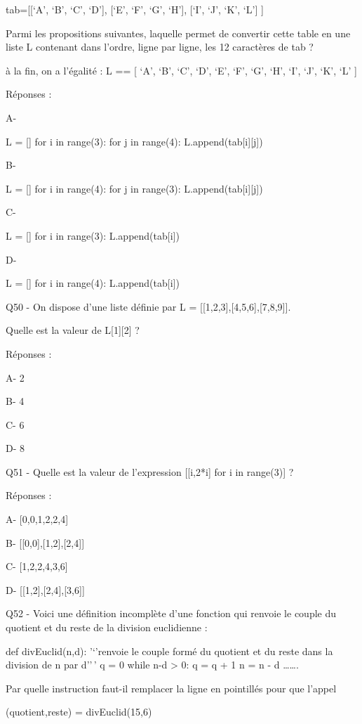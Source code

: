 \documentclass[
]{book}
\begin{document}
tab={[}{[}`A', `B', `C', `D'{]},
{[}`E', `F', `G', `H'{]},
{[}`I', `J', `K', `L'{]} {]}

Parmi les propositions suivantes, laquelle permet de convertir cette table en une liste L contenant dans l'ordre, ligne par ligne, les 12 caractères de tab ?

à la fin, on a l'égalité :
L == {[} `A', `B', `C', `D', `E', `F', `G', `H', `I', `J', `K', `L' {]}

Réponses :

A-

L = {[}{]}
for i in range(3):
for j in range(4):
L.append(tab{[}i{]}{[}j{]})

B-

L = {[}{]}
for i in range(4):
for j in range(3):
L.append(tab{[}i{]}{[}j{]})

C-

L = {[}{]}
for i in range(3):
L.append(tab{[}i{]})

D-

L = {[}{]}
for i in range(4):
L.append(tab{[}i{]})

Q50 - On dispose d'une liste définie par L = {[}{[}1,2,3{]},{[}4,5,6{]},{[}7,8,9{]}{]}.

Quelle est la valeur de L{[}1{]}{[}2{]} ?

Réponses :

A- 2

B- 4

C- 6

D- 8

Q51 - Quelle est la valeur de l'expression {[}{[}i,2*i{]} for i in range(3){]} ?

Réponses :

A- {[}0,0,1,2,2,4{]}

B- {[}{[}0,0{]},{[}1,2{]},{[}2,4{]}{]}

C- {[}1,2,2,4,3,6{]}

D- {[}{[}1,2{]},{[}2,4{]},{[}3,6{]}{]}

Q52 - Voici une définition incomplète d'une fonction qui renvoie le couple du quotient et du reste de la division euclidienne :

def divEuclid(n,d):
'`'renvoie le couple formé du quotient et du reste dans la division de n par d''\,'
q = 0
while n-d \textgreater{} 0:
q = q + 1
n = n - d
\ldots\ldots.

Par quelle instruction faut-il remplacer la ligne en pointillés pour que l'appel

(quotient,reste) = divEuclid(15,6)
\end{document}
